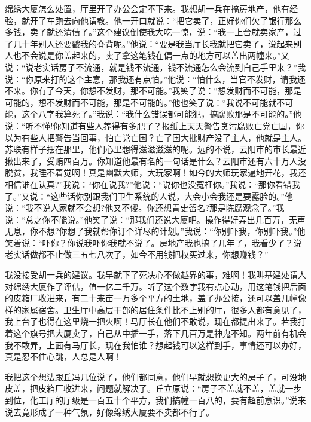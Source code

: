 \documentclass[12pt,oneside]{book}
\begin{document}
绵绣大厦怎么处置，厅里开了办公会定不下来。我想胡一兵在搞房地产，他有经验，就开了车跑去向他请教。他一开口就说：``把它卖了，正好你们欠了银行那么多钱，卖了就还清债了。''这个建议倒使我大吃一惊，说：``我一上台就卖家产，过了几十年别人还要戳我的脊背呢。''他说：``要是我当厅长我就把它卖了，说起来别人也不会说是你盖起来的，卖了拿这笔钱在偏一点的地方可以盖出两幢来。''又说：``说老实话房子不流通，就是钱不流通，钱不流通怎么会流到自己手里来？''我说：``你原来打的这个主意，那我还有点怕。''他说：``怕什么，当官不发财，请我还不来。你有了今天，你想不发财，那不可能。''我笑了说：``想发财而不可能，那是可能的，想不发财而不可能，那是不可能的。''他也笑了说：``我说不可能就不可能，这个八字我算死了。''我说：``我什么错误都可能犯，搞腐败那是不可能的。''他说：``听不懂!你知道有些人养得有多肥了？报纸上天天警告贪污腐败亡党亡国，你以为有些人把警告当回事，怕亡党亡国？亡了国大批财产没了主人，他就是主人。苏联有样子摆在那里，他们心里想得滋滋滋滋的呢。远的不说，云阳市的市长最近揪出来了，受贿四百万。你知道他最有名的一句话是什么？云阳市还有六十万人没脱贫，我睡不着觉啊！真是幽默大师，大玩家啊！如今的大师玩家遍地开花，我还相信谁在认真?''我说：``你在说我?''他说：``说你也没冤枉你。''我说：``那你看错我了。''又说：``这些话你别跟我们卫生系统的人说，大会小会我还是要露脸的。''他说：``我不说人家就不会想?他又不傻。你还想青史留名?那是陈腐观念了。''我说：``总之你不能说。''他笑了说：``那我们还说大厦吧。操作得好弄出几百万，无声无息，你不想?你想了我就帮你订个详尽的计划。''我说：``你别吓我，你别吓我。''他笑着说：``吓你？你说我吓你我就不说了。房地产我也搞了几年了，我看少了？说老实话做都不止做三五七八次了，如今不用钱把权买过来，你想赚钱？''

我没接受胡一兵的建议。我早就下了死决心不做越界的事，难啊！我叫基建处请人对绵绣大厦作了评估，值一亿二千万。听了这个数字我有点心动，用这笔钱把后面的皮箱厂收进来，有二十来亩一万多个平方的土地，盖了办公接，还可以盖几幢像样的家属宿舍。卫生厅中高层干部的居住条件比不上别的厅，很多人都有意见了，我上台了也得在这里烧一把火啊！马厅长在他们不敢说，现在都提出来了。若我打着这个旗号把大厦卖了，自己从中插一手，落下几百万是神鬼不知。两年前有机会我不敢弄，上面有马厅长，现在我怕谁？想起钱可以这样到手，事情还可以办好，真是忍不住心跳，人总是人啊！

我把这个想法跟丘冯几位说了，他们都同意，他们早就想换更大的房子了，可没地皮盖，把皮箱厂收进来，问题就解决了。丘立原说：``房子不盖就不盖，盖就一步到位，化工厅的厅级是一百五十个平方，我们搞幢一百八的，要有超前意识。''说来说去竟形成了一种气氛，好像绵绣大厦要不卖都不行了。
\end{document}
